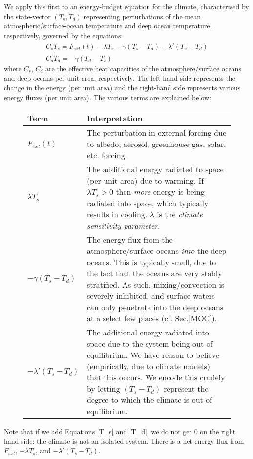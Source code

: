 We apply this first to an energy-budget equation for the climate, characterised by the state-vector $(T_s,T_d)$ representing perturbations of the mean atmospheric/surface-ocean temperature and deep ocean temperature, respectively, governed by the equations:
\begin{gather}
    \label{T_s}
    \boxed{C_s \dot{T}_s = F_{ext}(t)-\lambda T_s -\gamma (T_s-T_d) - \lambda'(T_s-T_d)}
    \\ 
    \label{T_d}
    \boxed{C_d \dot{T}_d = -\gamma (T_d-T_s)}
\end{gather}
where $C_s$, $C_d$ are the effective heat capacities of the atmosphere/surface oceans and deep oceans per unit area, respectively. The left-hand side represents the change in the energy (per unit area) and the right-hand side represents various energy fluxes (per unit area). The various terms are explained below:
\begin{figure}[H]
\begin{tabular}{|p{2.8cm}|p{13.4cm}|}
\hline
    Term & Interpretation \\
\hline
\hline
$F_{ext}(t)$ & The perturbation in external forcing due to albedo, aerosol, greenhouse gas, solar, etc. forcing.\\
\hline
$\lambda T_s$ & The additional energy radiated to space (per unit area) due to warming. If $\lambda T_s>0$ then \textit{more} energy is being radiated into space, which typically results in cooling. $\lambda$ is the \textit{climate sensitivity parameter}. \\ 
\hline
$-\gamma (T_s-T_d)$ & The energy flux from the atmosphere/surface oceans \textit{into} the deep oceans. This is typically small, due to the fact that the oceans are very stably stratified. As such, mixing/convection is severely inhibited, and surface waters can only penetrate into the deep oceans at a select few places (cf. Sec.\ref{MOC}).\\
\hline
$- \lambda'(T_s-T_d)$ & The additional energy radiated into space due to the system being out of equilibrium. We have reason to believe (empirically, due to climate models) that this occurs. We encode this crudely by letting $(T_s-T_d)$ represent the degree to which the climate is out of equilibrium.\\
\hline
\end{tabular}
\end{figure}
Note that if we add Equations \ref{T_s} and \ref{T_d}, we do not get $0$ on the right hand side: the climate is not an isolated system. There is a net energy flux from $F_{ext}$, $-\lambda T_s$, and $-\lambda ' (T_s-T_d)$.

